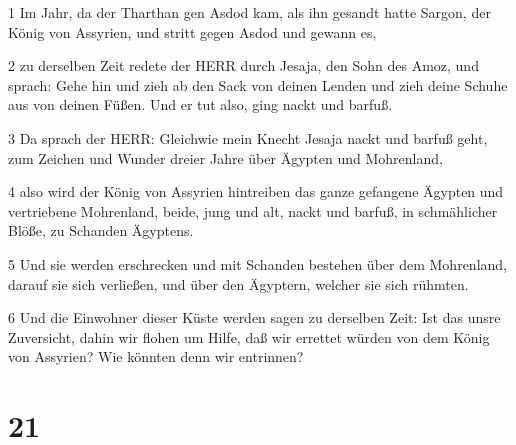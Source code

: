 \par 1 Im Jahr, da der Tharthan gen Asdod kam, als ihn gesandt hatte Sargon, der König von Assyrien, und stritt gegen Asdod und gewann es,
\par 2 zu derselben Zeit redete der HERR durch Jesaja, den Sohn des Amoz, und sprach: Gehe hin und zieh ab den Sack von deinen Lenden und zieh deine Schuhe aus von deinen Füßen. Und er tut also, ging nackt und barfuß.
\par 3 Da sprach der HERR: Gleichwie mein Knecht Jesaja nackt und barfuß geht, zum Zeichen und Wunder dreier Jahre über Ägypten und Mohrenland,
\par 4 also wird der König von Assyrien hintreiben das ganze gefangene Ägypten und vertriebene Mohrenland, beide, jung und alt, nackt und barfuß, in schmählicher Blöße, zu Schanden Ägyptens.
\par 5 Und sie werden erschrecken und mit Schanden bestehen über dem Mohrenland, darauf sie sich verließen, und über den Ägyptern, welcher sie sich rühmten.
\par 6 Und die Einwohner dieser Küste werden sagen zu derselben Zeit: Ist das unsre Zuversicht, dahin wir flohen um Hilfe, daß wir errettet würden von dem König von Assyrien? Wie könnten denn wir entrinnen?

\chapter{21}


